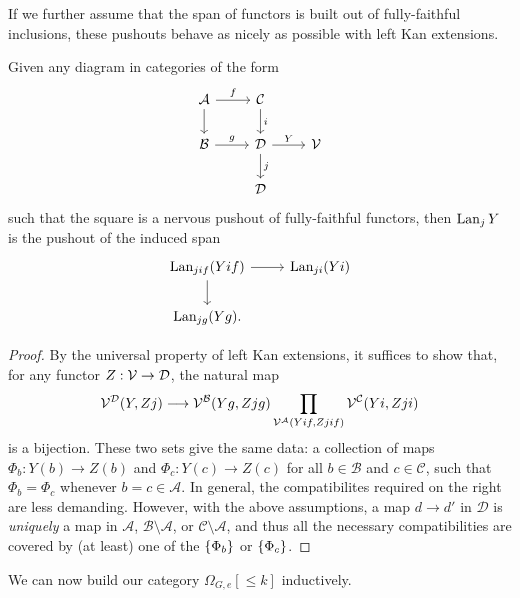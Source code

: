 \documentclass[a4paper,10pt]{article}%
\begin{document}
If we further assume that the span of functors is built out of fully-faithful inclusions, these pushouts behave as nicely as possible with left Kan extensions.
\begin{lemma}
  \label{LAN_PUSHOUT_LEMMA}
  Given any diagram in categories of the form 
\[
\begin{tikzcd}
  \mathcal A \arrow[d] \arrow[r, "f"] & \mathcal C \arrow[d, "i"]\\
  \mathcal B \arrow[r, "g"] & \mathcal D \arrow[r, "Y"] \arrow[d, "j"] & \V \\
  & \mathcal D
\end{tikzcd}
\]
such that the square is a nervous pushout of fully-faithful functors, then $\operatorname{Lan}_j Y$ is the pushout of the induced span
\[
\begin{tikzcd}
  \Lan_{j i f}(Y i f) \arrow[r] \arrow[d] & \Lan_{j i}(Y i)\\
  \Lan_{j g}(Y g).
\end{tikzcd}
\]
\end{lemma}
\begin{proof}
  By the universal property of left Kan extensions, it suffices to show that, for any functor $Z: \mathcal V \to \mathcal{D}$, the natural map
  \[
  \mathcal V^{\mathcal{D}}(Y, Z j) \longrightarrow \mathcal V^{\mathcal B} (Y g, Z j g) \prod\limits_{\mathcal V^{\mathcal A}(Y i f, Z j i f)} \mathcal V^{\mathcal C}(Y i, Z j i)
  \]
  is a bijection. These two sets give the same data: a collection of maps $\Phi_b: Y(b) \to Z(b)$ and $\Phi_c:Y(c) \to Z(c)$ for all $b\in \mathcal B$ and $c \in \mathcal C$, such that $\Phi_b = \Phi_c$ whenever $b = c \in \mathcal A$. In general, the compatibilites required on the right are less demanding. However, with the above assumptions, a map $d \to d'$ in $\mathcal D$ is \textit{uniquely} a map in $\mathcal A$, $\mathcal B \setminus \mathcal A$, or $\mathcal C \setminus \mathcal A$, and thus all the necessary compatibilities are covered by (at least) one of the $\left\{\Phi_b\right\}$ or $\left\{\Phi_c\right\}$. 
\end{proof}

We can now build our category $\Omega_{G,e}[\leq k]$ inductively.
\end{document}
